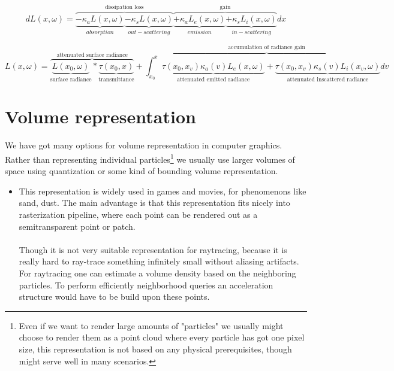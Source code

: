 {\begin{equation}
\label{eq:VOLRENDEQ}
dL(x,\omega)=\overbrace{\underbrace{{-\kappa_{a}L(x,\omega)} }_{absorption}\underbrace{-\kappa_{s}L(x,\omega)} _{out-scattering} }^\text{dissipation loss} \overbrace{\underbrace{{+\kappa_{a}L_{e}(x,\omega)} }_{emission}\underbrace{+\kappa_{s}L_{i}(x,\omega)} _{in-scattering} }^\text{gain}dx
 \end{equation}
 
 \begin{equation}
 \label{eq:EXTINTFORM}
 L(x,\omega)=\overbrace{\underbrace{L(x_{0},\omega)}_{\text{surface radiance}}*\underbrace{\tau(x_{0},x) }_{\text{transmittance}}}^{\text{attenuated surface radiance}}+
\overbrace{
  \int_{x_{0}}^{x}
    \underbrace{
      \tau(x_{0},x_{v})\kappa_{a}(v)L_{e}(x,\omega)
     }_{\text{attenuated emitted radiance}}
    +
    \underbrace{
       \tau(x_{0},x_{v})\kappa_{s}(v)L_{i}(x_{v},\omega)
    }_{\text{attenuated inscattered radiance}}
    dv
}^{\text{accumulation of radiance gain}}
 \end{equation} 

\clearpage{}
\section{Volume representation}
We have got many options for volume representation in computer graphics. Rather than representing individual particles\footnote{Even if we want to render large amounts of "particles" we usually might choose to render them as a point cloud where every particle has got one pixel size, this representation is not based on any physical prerequisites, though might serve well in many scenarios.} we usually use larger volumes of space using quantization or some kind of bounding volume representation.

\begin{itemize}
\item {}
This representation is widely used in games and movies, for phenomenons like sand, dust. The main advantage is that this representation fits nicely into rasterization pipeline, where each point can be rendered out as a semitransparent point or patch. 
\\
\\
Though it is not very suitable representation for raytracing, because it is really hard to ray-trace something infinitely small without aliasing artifacts. For raytracing one can estimate a volume density based on the neighboring particles. To perform efficiently neighborhood queries an acceleration structure would have to be build upon these points.


\end{itemize}}
